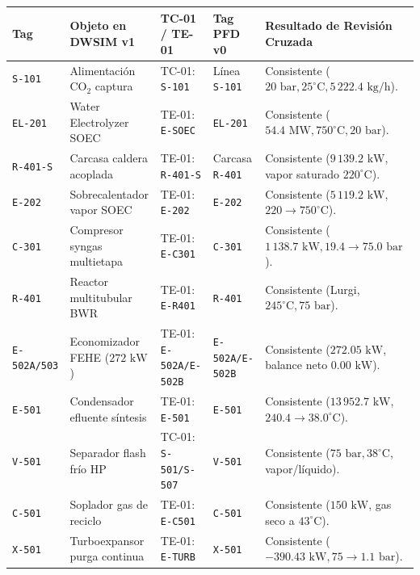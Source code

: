 \documentclass[11pt,letterpaper]{article}
\begin{document}
\vspace{0.2cm}
\begin{center}
\footnotesize
\begin{tabularx}{\textwidth}{lp{3.5cm}p{3.0cm}p{2.5cm}X}
\toprule
\textbf{Tag} & \textbf{Objeto en DWSIM v1} & \textbf{TC-01 / TE-01} & \textbf{Tag PFD v0} & \textbf{Resultado de Revisión Cruzada} \\
\midrule
\texttt{S-101} & Alimentación $\text{CO}_2$ captura & TC-01: \texttt{S-101} & Línea \texttt{S-101} & Consistente ($20\text{ bar}, 25^\circ\text{C}, 5\,222.4\text{ kg/h}$). \\
\texttt{EL-201}& Water Electrolyzer SOEC & TE-01: \texttt{E-SOEC} & \texttt{EL-201} & Consistente ($54.4\text{ MW}, 750^\circ\text{C}, 20\text{ bar}$). \\
\texttt{R-401-S} & Carcasa caldera acoplada & TE-01: \texttt{R-401-S} & Carcasa \texttt{R-401} & Consistente ($9\,139.2\text{ kW}$, vapor saturado $220^\circ\text{C}$). \\
\texttt{E-202} & Sobrecalentador vapor SOEC& TE-01: \texttt{E-202} & \texttt{E-202} & Consistente ($5\,119.2\text{ kW}$, $220 \to 750^\circ\text{C}$). \\
\texttt{C-301} & Compresor syngas multietapa & TE-01: \texttt{E-C301} & \texttt{C-301} & Consistente ($1\,138.7\text{ kW}, 19.4 \to 75.0\text{ bar}$). \\
\texttt{R-401} & Reactor multitubular BWR & TE-01: \texttt{E-R401} & \texttt{R-401} & Consistente (Lurgi, $245^\circ\text{C}, 75\text{ bar}$). \\
\texttt{E-502A/503}& Economizador FEHE ($272\text{ kW}$) & TE-01: \texttt{E-502A/E-502B} & \texttt{E-502A/E-502B} & Consistente ($272.05\text{ kW}$, balance neto $0.00\text{ kW}$). \\
\texttt{E-501} & Condensador efluente síntesis& TE-01: \texttt{E-501} & \texttt{E-501} & Consistente ($13\,952.7\text{ kW}$, $240.4 \to 38.0^\circ\text{C}$). \\
\texttt{V-501} & Separador flash frío HP & TC-01: \texttt{S-501/S-507}& \texttt{V-501} & Consistente ($75\text{ bar}, 38^\circ\text{C}$, vapor/líquido). \\
\texttt{C-501} & Soplador gas de reciclo & TE-01: \texttt{E-C501} & \texttt{C-501} & Consistente ($150\text{ kW}$, gas seco a $43^\circ\text{C}$). \\
\texttt{X-501} & Turboexpansor purga continua & TE-01: \texttt{E-TURB} & \texttt{X-501} & Consistente ($-390.43\text{ kW}, 75 \to 1.1\text{ bar}$). \\

\end{tabularx}
\end{center}
\end{document}
